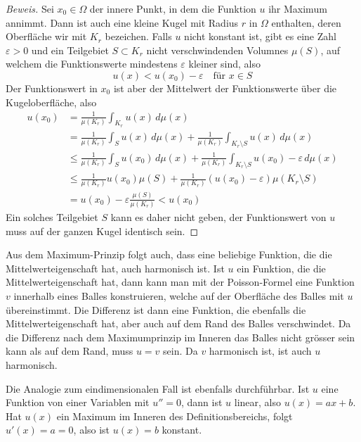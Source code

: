 \begin{proof}[Beweis]
Sei $x_0\in\Omega$ der innere Punkt, in dem die Funktion $u$
ihr Maximum annimmt. Dann ist auch eine kleine Kugel mit Radius
$r$ in $\Omega$ enthalten, deren Oberfläche wir mit $K_r$
bezeichen. Falls $u$ nicht konstant ist, gibt
es eine Zahl $\varepsilon > 0$ und 
ein Teilgebiet $S\subset K_r$ nicht verschwindenden Volumnes $\mu(S)$,
auf welchem die Funktionswerte
mindestens $\varepsilon$ kleiner sind, also
\[
u(x)<u(x_0)-\varepsilon\quad\text{für $x\in S$}
\]
Der Funktionswert in $x_0$ ist aber der Mittelwert der Funktionswerte
über die Kugeloberfläche, also
\begin{align*}
u(x_0)
&=
\frac1{\mu(K_r)}\int_{K_r}u(x)\,d\mu(x)
\\
&=\frac1{\mu(K_r)}\int_Su(x)\,d\mu(x)+\frac1{\mu(K_r)}\int_{K_r\setminus S}u(x)\,d\mu(x)
\\
&\le \frac1{\mu(K_r)}\int_S u(x_0)\,d\mu(x)+\frac1{\mu(K_r)}\int_{K_r\setminus S}u(x_0)-\varepsilon\,d\mu(x)
\\
&\le \frac1{\mu(K_r)}u(x_0)\mu(S)+\frac1{\mu(K_r)}(u(x_0)-\varepsilon)\mu(K_r\setminus S)
\\
&=
u(x_0)-\varepsilon\frac{\mu(S)}{\mu(K_r)}<u(x_0)
\end{align*}
Ein solches Teilgebiet $S$ kann es daher nicht geben, der Funktionswert
von $u$ muss auf der ganzen Kugel identisch sein.
\end{proof}

Aus dem Maximum-Prinzip folgt auch, dass eine beliebige Funktion, die
die Mittelwerteigenschaft hat, auch harmonisch ist. Ist $u$ ein
Funktion, die die Mittelwerteigenschaft hat, dann kann man mit der
Poisson-Formel eine Funktion $v$ innerhalb eines Balles konstruieren,
welche auf der Oberfläche des Balles mit $u$ übereinstimmt.
Die Differenz ist dann eine Funktion, die ebenfalls die Mittelwerteigenschaft
hat, aber auch auf dem Rand des Balles verschwindet. Da die Differenz
nach dem Maximumprinzip
im Inneren das Balles nicht grösser sein kann als auf dem Rand,
muss $u=v$ sein. Da $v$ harmonisch ist, ist auch $u$ harmonisch.

Die Analogie zum eindimensionalen Fall ist ebenfalls durchführbar.
Ist $u$ eine Funktion von einer Variablen mit $u''=0$, dann ist
$u$ linear, also $u(x)=ax+b$. Hat $u(x)$ ein Maximum im Inneren
des Definitionsbereichs, folgt $u'(x)=a=0$, also ist $u(x)=b$ konstant.

